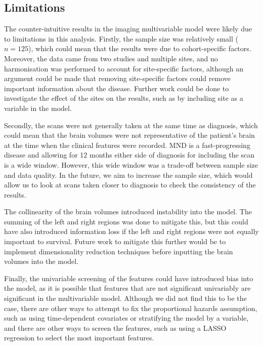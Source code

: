 \subsection{Limitations}
The counter-intuitive results in the imaging multivariable model were likely due to limitations in this analysis.
Firstly, the sample size was relatively small ($n=125$), which could mean that the results were due to cohort-specific factors.
Moreover, the data came from two studies and multiple sites, and no harmonisation was performed to account for site-specific factors, although an argument could be made that removing site-specific factors could remove important information about the disease.
Further work could be done to investigate the effect of the sites on the results, such as by including site as a variable in the model.

Secondly, the scans were not generally taken at the same time as diagnosis, which could mean that the brain volumes were not representative of the patient's brain at the time when the clinical features were recorded.
MND is a fast-progressing disease and allowing for 12 months either side of diagnosis for including the scan is a wide window.
However, this wide window was a trade-off between sample size and data quality.
In the future, we aim to increase the sample size, which would allow us to look at scans taken closer to diagnosis to check the consistency of the results.

The collinearity of the brain volumes introduced instability into the model.
The summing of the left and right regions was done to mitigate this, but this could have also introduced information loss if the left and right regions were not equally important to survival.
Future work to mitigate this further would be to implement dimensionality reduction techniques before inputting the brain volumes into the model.

Finally, the univariable screening of the features could have introduced bias into the model, as it is possible that features that are not significant univariably are significant in the multivariable model.
Although we did not find this to be the case, there are other ways to attempt to fix the proportional hazards assumption, such as using time-dependent covariates or stratifying the model by a variable, and there are other ways to screen the features, such as using a LASSO regression to select the most important features.


